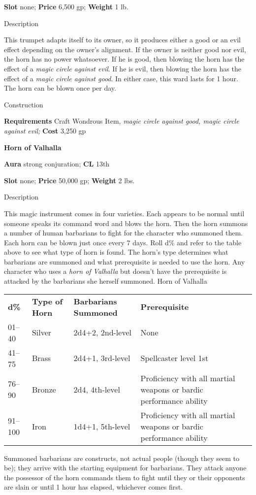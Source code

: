 \textbf{Slot} none; \textbf{Price} 6,500 gp; \textbf{Weight} 1 lb.
				
Description
				
This trumpet adapts itself to its owner, so it produces either a good or an evil effect depending on the owner's alignment. If the owner is neither good nor evil, the horn has no power whatsoever. If he is good, then blowing the horn has the effect of a \textit{magic circle against evil}. If he is evil, then blowing the horn has the effect of a \textit{magic circle against good}. In either case, this ward lasts for 1 hour. The horn can be blown once per day. 
				
Construction
				
\textbf{Requirements} Craft Wondrous Item,\textit{ magic circle against good, magic circle against evil;}\textbf{ Cost }3,250 gp
				
\textbf{Horn of Valhalla}
				
\textbf{Aura} strong conjuration;\textbf{ CL }13th
				
\textbf{Slot} none; \textbf{Price} 50,000 gp; \textbf{Weight} 2 lbs.
				
Description
				
This magic instrument comes in four varieties. Each appears to be normal until someone speaks its command word and blows the horn. Then the horn summons a number of human barbarians to fight for the character who summoned them. Each horn can be blown just once every 7 days. Roll d\% and refer to the table above to see what type of horn is found. The horn's type determines what barbarians are summoned and what prerequisite is needed to use the horn. Any character who uses a \textit{horn of Valhalla} but doesn't have the prerequisite is attacked by the barbarians she herself summoned.
				Horn of Valhalla
\begin{tabular}{llll}
\textbf{d\%} & \textbf{Type of Horn} & \textbf{Barbarians Summoned} & \textbf{Prerequisite}                                              \\
01–40        & Silver                & 2d4+2, 2nd-level             & None                                                               \\
41–75        & Brass                 & 2d4+1, 3rd-level             & Spellcaster level 1st                                              \\
76–90        & Bronze                & 2d4, 4th-level               & Proficiency with all martial weapons or bardic performance ability \\
91–100       & Iron                  & 1d4+1, 5th-level             & Proficiency with all martial weapons or bardic performance ability
\end{tabular}				
Summoned barbarians are constructs, not actual people (though they seem to be); they arrive with the starting equipment for barbarians. They attack anyone the possessor of the horn commands them to fight until they or their opponents are slain or until 1 hour has elapsed, whichever comes first. 
				
